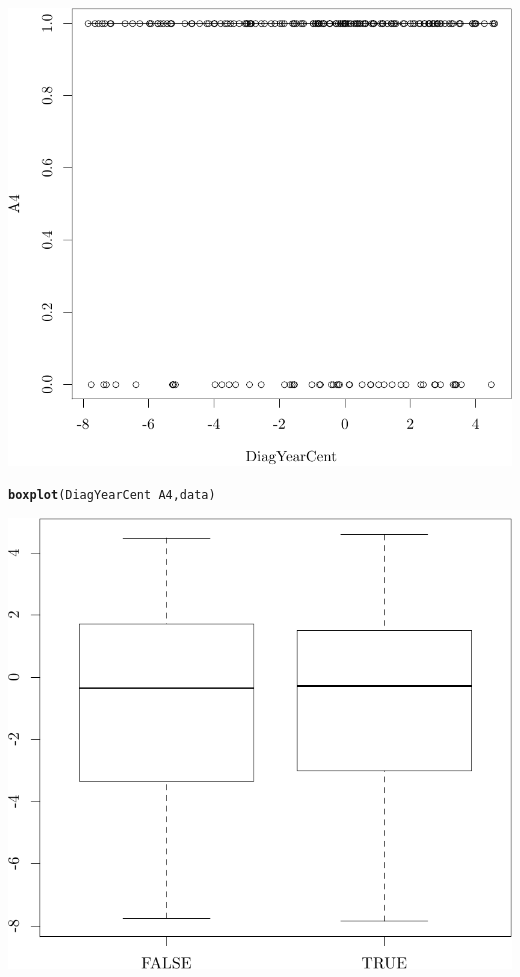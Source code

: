 \documentclass{article}\usepackage[]{graphicx}\usepackage[]{color}
\makeatletter
\def\maxwidth{ %
  \ifdim\Gin@nat@width>\linewidth
    \linewidth
  \else
    \Gin@nat@width
  \fi
}
\newcommand{\hlopt}[1]{\textcolor[rgb]{0,0,0}{#1}}%
\newcommand{\hlstd}[1]{\textcolor[rgb]{0.345,0.345,0.345}{#1}}%
\newcommand{\hlkwd}[1]{\textcolor[rgb]{0.737,0.353,0.396}{\textbf{#1}}}%
\newenvironment{kframe}{%
 \def\at@end@of@kframe{}%
 \ifinner\ifhmode%
  \def\at@end@of@kframe{\end{minipage}}%
  \begin{minipage}{\columnwidth}%
 \fi\fi%
 \def\FrameCommand##1{\hskip\@totalleftmargin \hskip-\fboxsep
 \colorbox{shadecolor}{##1}\hskip-\fboxsep
     \hskip-\linewidth \hskip-\@totalleftmargin \hskip\columnwidth}%
 \MakeFramed {\advance\hsize-\width
   \@totalleftmargin\z@ \linewidth\hsize
   \@setminipage}}%
 {\par\unskip\endMakeFramed%
 \at@end@of@kframe}
\newenvironment{knitrout}{}{} %
\makeatother
\begin{document}
\begin{knitrout}
{\centering \includegraphics[width=\maxwidth]{figure/05-eda-dod-check-9} 

}


\begin{kframe}\begin{alltt}
\hlkwd{boxplot}\hlstd{(DiagYearCent} \hlopt{~} \hlstd{A4, data)}
\end{alltt}
\end{kframe}

{\centering \includegraphics[width=\maxwidth]{figure/05-eda-dod-check-10} 

}
\end{knitrout}
\end{document}
